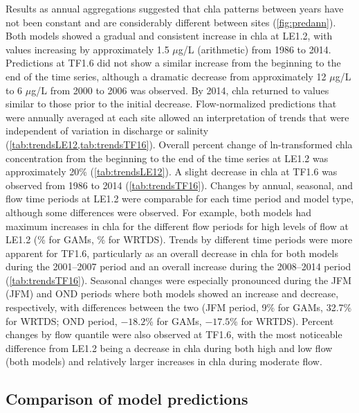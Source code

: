 \documentclass[letterpaper,12pt,oneside]{article}\usepackage[]{graphicx}\usepackage[]{color}
\newcommand{\mugl}{$\mu$g/L }
\begin{document}
Results as annual aggregations suggested that \ac{chla} patterns between years have not been constant and are considerably different between sites (\cref{fig:predann}).  Both models showed a gradual and consistent increase in \ac{chla} at LE1.2, with values increasing by approximately 1.5 \mugl (arithmetic) from 1986 to 2014.  Predictions at TF1.6 did not show a similar increase from the beginning to the end of the time series, although a dramatic decrease from approximately 12 \mugl to 6 \mugl from 2000 to 2006 was observed. By 2014, \ac{chla} returned to values similar to those prior to the initial decrease.  Flow-normalized predictions that were annually averaged at each site allowed an interpretation of trends that were independent of variation in discharge or salinity (\cref{tab:trendsLE12,tab:trendsTF16}).  Overall percent change of ln-transformed \ac{chla} concentration from the beginning to the end of the time series at LE1.2 was approximately 20\% (\cref{tab:trendsLE12}).  A slight decrease in \ac{chla} at TF1.6 was observed from 1986 to 2014 (\cref{tab:trendsTF16}).  Changes by annual, seasonal, and flow time periods at LE1.2 were comparable for each time period and model type, although some differences were observed.  For example, both models had maximum increases in \ac{chla} for the different flow periods for high levels of flow at LE1.2 (\% for \acp{GAM}, \% for \ac{WRTDS}).  Trends by different time periods were more apparent for TF1.6, particularly as an overall decrease in \ac{chla} for both models during the 2001--2007 period and an overall increase during the 2008--2014 period (\cref{tab:trendsTF16}).  Seasonal changes were especially pronounced during the \acl{JFM} (\acs{JFM}) and \ac{OND} periods where both models showed an increase and decrease, respectively, with differences between the two (\ac{JFM} period, 9\% for \acp{GAM}, 32.7\% for \ac{WRTDS}; \ac{OND} period, \ensuremath{-18.2}\% for \acp{GAM}, \ensuremath{-17.5}\% for \ac{WRTDS}).  Percent changes by flow quantile were also observed at TF1.6, with the most noticeable difference from LE1.2 being a decrease in \ac{chla} during both high and low flow (both models) and relatively larger increases in \ac{chla} during moderate flow.  

\subsection*{Comparison of model predictions}
\end{document}
